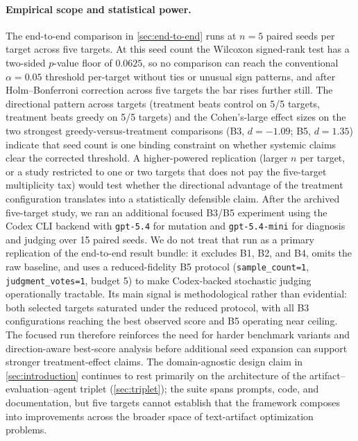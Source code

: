 \paragraph{Empirical scope and statistical power.}
The end-to-end comparison in \cref{sec:end-to-end} runs at $n = 5$ paired seeds per target across five targets.
At this seed count the Wilcoxon signed-rank test has a two-sided $p$-value floor of $0.0625$, so no comparison can reach the conventional $\alpha = 0.05$ threshold per-target without ties or unusual sign patterns, and after Holm--Bonferroni correction across five targets the bar rises further still.
The directional pattern across targets (treatment beats control on 5/5 targets, treatment beats greedy on 5/5 targets) and the Cohen's-large effect sizes on the two strongest greedy-versus-treatment comparisons (B3, $d = -1.09$; B5, $d = 1.35$) indicate that seed count is one binding constraint on whether systemic claims clear the corrected threshold.
A higher-powered replication (larger $n$ per target, or a study restricted to one or two targets that does not pay the five-target multiplicity tax) would test whether the directional advantage of the treatment configuration translates into a statistically defensible claim.
After the archived five-target study, we ran an additional focused B3/B5 experiment using the Codex CLI backend with \texttt{gpt-5.4} for mutation and \texttt{gpt-5.4-mini} for diagnosis and judging over 15 paired seeds.
We do not treat that run as a primary replication of the end-to-end result bundle: it excludes B1, B2, and B4, omits the raw baseline, and uses a reduced-fidelity B5 protocol (\texttt{sample\_count=1}, \texttt{judgment\_votes=1}, budget 5) to make Codex-backed stochastic judging operationally tractable.
Its main signal is methodological rather than evidential: both selected targets saturated under the reduced protocol, with all B3 configurations reaching the best observed score and B5 operating near ceiling.
The focused run therefore reinforces the need for harder benchmark variants and direction-aware best-score analysis before additional seed expansion can support stronger treatment-effect claims.
The domain-agnostic design claim in \cref{sec:introduction} continues to rest primarily on the architecture of the artifact--evaluation--agent triplet (\cref{sec:triplet}); the suite spans prompts, code, and documentation, but five targets cannot establish that the framework composes into improvements across the broader space of text-artifact optimization problems.

